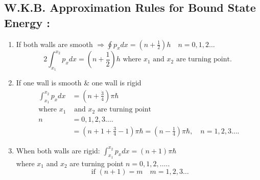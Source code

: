 \subsection{ W.K.B. Approximation Rules for Bound State Energy :}
\begin{enumerate}
	\item  If both walls are smooth $\Rightarrow \oint p_{x} d x=\left(n+\frac{1}{2}\right) h \quad n=0,1,2 \ldots$
	$$
	2 \int_{x_{1}}^{x_{2}} p_{x} d x=\left(n+\frac{1}{2}\right) h \text { where } x_{1} \text { and } x_{2} \text { are turning point. }
	$$
	\item If one wall is smooth \& one wall is rigid 
	$$
	\begin{aligned}
			\int_{x_{1}}^{x_{2}} p_{x} d x&=\left(n+\frac{\dot{3}}{4}\right) \pi \hbar \quad\\
		\text{where }x_{1}&\text{ and }x_{2}\text{ are turning point}\\
		n&=0,1,2,3 \ldots . \\
		&=\left(n+1+\frac{3}{4}-1\right) \pi \hbar=\left(n-\frac{1}{4}\right) \pi \hbar, \quad n=1,2,3 \ldots .
	\end{aligned}
	$$
	  \item When both walls are rigid:
	  $\int_{x_{1}}^{x_{2}} p_{x} d x=(n+1) \pi \hbar \quad$ \\
	  where $x_{1}$ and $x_{2}$ are turning point $n=0,1,2, \ldots . .$
	  $$
	  \text { if }(n+1)=m \quad m=1,2,3 \ldots
	  $$
\end{enumerate}


